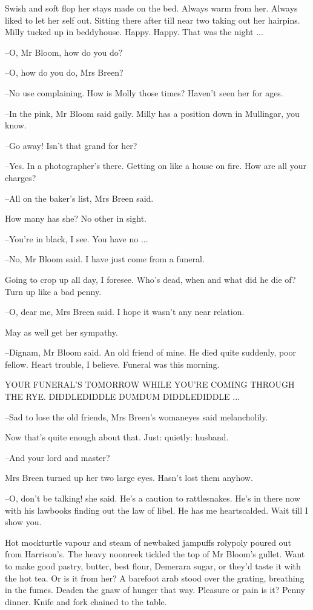 Swish and soft flop her stays made on the bed. Always warm from
her. Always liked to let her self out. Sitting there after till near two
taking out her hairpins. Milly tucked up in beddyhouse. Happy. Happy.
That was the night ...

--O, Mr Bloom, how do you do?

--O, how do you do, Mrs Breen?

--No use complaining. How is Molly those times? Haven't seen her for ages.

--In the pink, Mr Bloom said gaily. Milly has a position down in
Mullingar, you know.

--Go away! Isn't that grand for her?

--Yes. In a photographer's there. Getting on like a house on fire. How are
all your charges?

--All on the baker's list, Mrs Breen said.

How many has she? No other in sight.

--You're in black, I see. You have no ...

--No, Mr Bloom said. I have just come from a funeral.

Going to crop up all day, I foresee. Who's dead, when and what did
he die of? Turn up like a bad penny.

--O, dear me, Mrs Breen said. I hope it wasn't any near relation.

May as well get her sympathy.

--Dignam, Mr Bloom said. An old friend of mine. He died quite suddenly,
poor fellow. Heart trouble, I believe. Funeral was this morning.


    YOUR FUNERAL'S TOMORROW
    WHILE YOU'RE COMING THROUGH THE RYE.
    DIDDLEDIDDLE DUMDUM
    DIDDLEDIDDLE ...


--Sad to lose the old friends, Mrs Breen's womaneyes said melancholily.

Now that's quite enough about that. Just: quietly: husband.

--And your lord and master?

Mrs Breen turned up her two large eyes. Hasn't lost them anyhow.

--O, don't be talking! she said. He's a caution to rattlesnakes. He's in
there now with his lawbooks finding out the law of libel. He has me
heartscalded. Wait till I show you.

Hot mockturtle vapour and steam of newbaked jampuffs rolypoly
poured out from Harrison's. The heavy noonreek tickled the top of Mr
Bloom's gullet. Want to make good pastry, butter, best flour, Demerara
sugar, or they'd taste it with the hot tea. Or is it from her? A barefoot
arab stood over the grating, breathing in the fumes. Deaden the gnaw of
hunger that way. Pleasure or pain is it? Penny dinner. Knife and fork
chained to the table.

